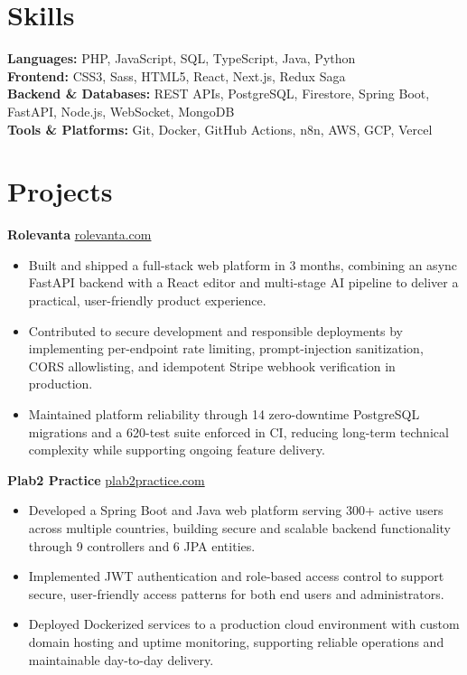 \documentclass[11pt]{article}       %
\begin{document}
\vspace{-10.5pt}

\section*{Skills}
\textbf{Languages:} PHP, JavaScript, SQL, TypeScript, Java, Python \\
\textbf{Frontend:} CSS3, Sass, HTML5, React, Next.js, Redux Saga \\
\textbf{Backend \& Databases:} REST APIs, PostgreSQL, Firestore, Spring Boot, FastAPI, Node.js, WebSocket, MongoDB \\
\textbf{Tools \& Platforms:} Git, Docker, GitHub Actions, n8n, AWS, GCP, Vercel
\vspace{-5pt}






\section*{Projects}
\textbf{Rolevanta} \hfill \href{https://rolevanta.com}{rolevanta.com} \\
\vspace{-9pt}
\begin{itemize}
  \item Built and shipped a full-stack web platform in 3 months, combining an async FastAPI backend with a React editor and multi-stage AI pipeline to deliver a practical, user-friendly product experience.
  \item Contributed to secure development and responsible deployments by implementing per-endpoint rate limiting, prompt-injection sanitization, CORS allowlisting, and idempotent Stripe webhook verification in production.
  \item Maintained platform reliability through 14 zero-downtime PostgreSQL migrations and a 620-test suite enforced in CI, reducing long-term technical complexity while supporting ongoing feature delivery.
\end{itemize}

\textbf{Plab2 Practice} \hfill \href{https://plab2practice.com}{plab2practice.com} \\
\vspace{-9pt}
\begin{itemize}
  \item Developed a Spring Boot and Java web platform serving 300+ active users across multiple countries, building secure and scalable backend functionality through 9 controllers and 6 JPA entities.
  \item Implemented JWT authentication and role-based access control to support secure, user-friendly access patterns for both end users and administrators.
  \item Deployed Dockerized services to a production cloud environment with custom domain hosting and uptime monitoring, supporting reliable operations and maintainable day-to-day delivery.
\end{itemize}
\end{document}
